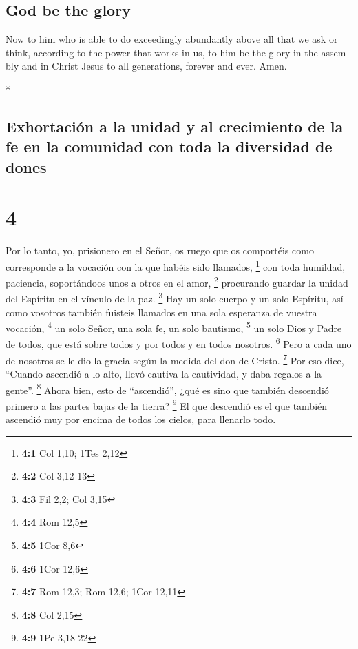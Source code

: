 \begin{paracol}{2}
\begin{otherlanguage}{english}
\hypertarget{god-be-the-glory}{%
\subsection{God be the glory}\label{god-be-the-glory}}

 Now to him who is able to do exceedingly abundantly
above all that we ask or think, according to the power that works in us,
 to him be the glory in the assembly and in Christ Jesus
to all generations, forever and ever. Amen.

\end{otherlanguage}

\switchcolumn[0]*

\hypertarget{exhortaciuxf3n-a-la-unidad-y-al-crecimiento-de-la-fe-en-la-comunidad-con-toda-la-diversidad-de-dones}{%
\subsection{Exhortación a la unidad y al crecimiento de la fe en la
comunidad con toda la diversidad de
dones}\label{exhortaciuxf3n-a-la-unidad-y-al-crecimiento-de-la-fe-en-la-comunidad-con-toda-la-diversidad-de-dones}}

\hypertarget{section-6}{%
\section{4}\label{section-6}}

 Por lo tanto, yo, prisionero en el Señor, os ruego que os
comportéis como corresponde a la vocación con la que habéis sido
llamados, \footnote{\textbf{4:1} Col 1,10; 1Tes 2,12}  con
toda humildad, paciencia, soportándoos unos a otros en el amor,
\footnote{\textbf{4:2} Col 3,12-13}  procurando guardar la
unidad del Espíritu en el vínculo de la paz. \footnote{\textbf{4:3} Fil
  2,2; Col 3,15}  Hay un solo cuerpo y un solo Espíritu,
así como vosotros también fuisteis llamados en una sola esperanza de
vuestra vocación, \footnote{\textbf{4:4} Rom 12,5}  un
solo Señor, una sola fe, un solo bautismo, \footnote{\textbf{4:5} 1Cor
  8,6}  un solo Dios y Padre de todos, que está sobre
todos y por todos y en todos nosotros. \footnote{\textbf{4:6} 1Cor 12,6}
 Pero a cada uno de nosotros se le dio la gracia según la
medida del don de Cristo. \footnote{\textbf{4:7} Rom 12,3; Rom 12,6;
  1Cor 12,11}  Por eso dice, ``Cuando ascendió a lo alto,
llevó cautiva la cautividad, y daba regalos a la gente''. \footnote{\textbf{4:8}
  Col 2,15}  Ahora bien, esto de ``ascendió'', ¿qué es
sino que también descendió primero a las partes bajas de la tierra?
\footnote{\textbf{4:9} 1Pe 3,18-22}  El que descendió es
el que también ascendió muy por encima de todos los cielos, para
llenarlo todo.


\end{paracol}
